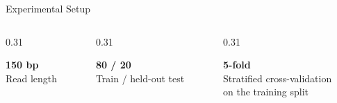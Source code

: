 \documentclass[aspectratio=169,11pt]{beamer}
\begin{document}
\begin{frame}{Experimental Setup}
\begin{columns}[T,onlytextwidth]
    \begin{column}{0.31\textwidth}
        \centering

        {\Large\color{mitoblue}\textbf{150 bp}}\\[0.04cm]
        {\small Read length}
    \end{column}

    \begin{column}{0.31\textwidth}
        \centering

        {\Large\color{mitoblue}\textbf{80 / 20}}\\[0.04cm]
        {\small Train / held-out test}
    \end{column}

    \begin{column}{0.31\textwidth}
        \centering

        {\Large\color{mitoblue}\textbf{5-fold}}\\[0.04cm]
        {\small
        Stratified cross-validation\\[-0.02cm]
        on the training split
        }
    \end{column}

\end{columns}

\end{frame}
\end{document}
